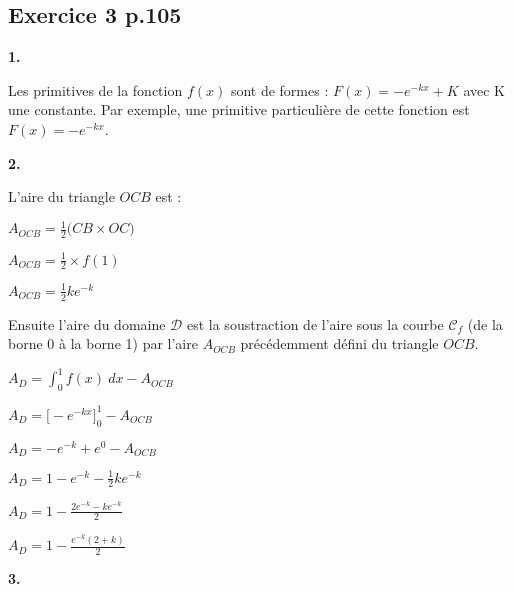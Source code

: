 \documentclass{article}
\begin{document}
\begin{center}
\section{Exercice 3 p.105}
\end{center}


\textbf{1.}
\vspace{2mm}

\noindent Les primitives de la fonction $f(x)$ sont de formes : $F(x) = -e^{-kx} + K$ avec K une constante. Par exemple, une primitive particulière de cette fonction est $F(x) = -e^{-kx}$.

\vspace{2mm}
\textbf{2.}
\vspace{2mm}

\noindent L'aire du triangle $OCB$ est :

$A_{OCB} = \displaystyle\frac{1}{2}\Big(CB \times OC \Big)$

$A_{OCB} = \displaystyle\frac{1}{2} \times f(1)$

$A_{OCB} = \displaystyle\frac{1}{2} k e^{-k}$

\noindent Ensuite l'aire du domaine $\mathcal{D}$ est la soustraction de l'aire sous la courbe $\mathcal{C}_f$ (de la borne 0 à la borne 1) par l'aire $A_{OCB}$ précédemment défini du triangle $OCB$.

$A_{D} = \displaystyle\int_0^1 f(x) \: dx - A_{OCB}$

$A_{D} = \Big[-e^{-kx} \Big]_0^1 - A_{OCB}$

$A_{D} = -e^{-k} + e^0 - A_{OCB}$

$A_{D} = 1 - e^{-k} - \displaystyle\frac{1}{2} k e^{-k}$

$A_{D} = 1 - \displaystyle\frac{2 e^{-k} -  k e^{-k}}{2}$

$A_{D} = 1 - \displaystyle\frac{e^{-k}(2 + k)}{2}$

\vspace{2mm}
\textbf{3.}
\vspace{2mm}
\end{document}
